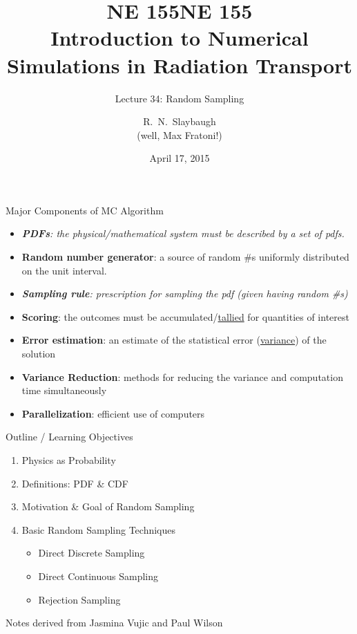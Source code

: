 \documentclass[xcolor=x11names,compress]{beamer}
\title{NE 155}
\author{R.\ N.\ Slaybaugh \\
(well, Max Fratoni!)}
\date{April 17, 2015}
\renewcommand{\(}{\begin{columns}}
\renewcommand{\)}{\end{columns}}
\newcommand{\<}[1]{\begin{column}{#1}}
\renewcommand{\>}{\end{column}}
\begin{document}
\begin{frame}
\title{NE 155\\Introduction to Numerical Simulations in Radiation Transport}
\subtitle{Lecture 34: Random Sampling}
\titlepage
\end{frame}


\begin{frame}{Major Components of MC Algorithm}

\begin{itemize}
  \item \textit{\textbf{PDFs}: the physical/mathematical system must be described by a set of pdfs.}
  \pause
  \item \textbf{Random number generator}: a source of random \#s uniformly distributed on the unit interval.
  \pause
  \item \textit{\textbf{Sampling rule}: prescription for sampling the pdf (given having random \#s)}
  \pause
  \item \textbf{Scoring}: the outcomes must be accumulated/\underline{tallied} for quantities of interest
  \pause
  \item \textbf{Error estimation}: an estimate of the statistical error (\underline{variance}) of the solution
    \pause
  \item \textbf{Variance Reduction}: methods for reducing the variance and computation time simultaneously
    \pause
  \item \textbf{Parallelization}: efficient use of computers
\end{itemize}
\end{frame}


\begin{frame}{Outline / Learning Objectives}

    \begin{enumerate}
    \item Physics as Probability
    \item Definitions: PDF \& CDF
    \item Motivation \& Goal of Random Sampling
    \item Basic Random Sampling Techniques
      \begin{itemize}
        \item Direct Discrete Sampling
        \item Direct Continuous Sampling
        \item Rejection Sampling
      \end{itemize}
    \end{enumerate}

\vspace*{1em}
Notes derived from Jasmina Vujic and Paul Wilson
\end{frame}
\end{document}
